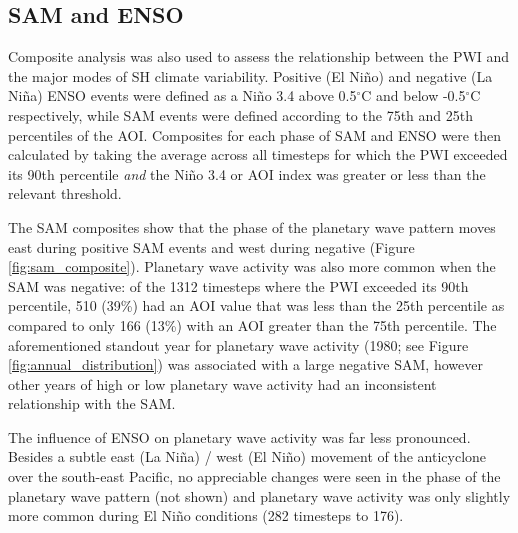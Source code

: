 \subsection{SAM and ENSO}

Composite analysis was also used to assess the relationship between the PWI and the major modes of SH climate variability. Positive (El Ni\~{n}o) and negative (La Ni\~{n}a) ENSO events were defined as a Ni\~{n}o 3.4 above 0.5$^{\circ}$C and below -0.5$^{\circ}$C respectively, while SAM events were defined according to the 75th and 25th percentiles of the AOI. Composites for each phase of SAM and ENSO were then calculated by taking the average across all timesteps for which the PWI exceeded its 90th percentile \textit{and} the Ni\~{n}o 3.4 or AOI index was greater or less than the relevant threshold. 

The SAM composites show that the phase of the planetary wave pattern moves east during positive SAM events and west during negative (Figure \ref{fig:sam_composite}). Planetary wave activity was also more common when the SAM was negative: of the 1312 timesteps where the PWI exceeded its 90th percentile, 510 (39\%) had an AOI value that was less than the 25th percentile as compared to only 166 (13\%) with an AOI greater than the 75th percentile. The aforementioned standout year for planetary wave activity (1980; see Figure \ref{fig:annual_distribution}) was associated with a large negative SAM, however other years of high or low planetary wave activity had an inconsistent relationship with the SAM.

The influence of ENSO on planetary wave activity was far less pronounced. Besides a subtle east (La Ni\~{n}a) / west (El Ni\~{n}o) movement of the anticyclone over the south-east Pacific, no appreciable changes were seen in the phase of the planetary wave pattern (not shown) and planetary wave activity was only slightly more common during El Ni\~{n}o conditions (282 timesteps to 176).      